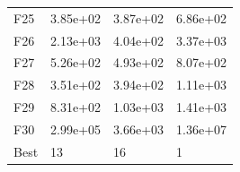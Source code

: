 \begin{table}[H]
\begin{minipage}{.5\linewidth}
\begin{tabular}{llll}
          F25  &  3.85e+02 &  3.87e+02 &  6.86e+02 \\
          F26  &  2.13e+03 &  4.04e+02 &  3.37e+03 \\
          F27  &  5.26e+02 &  4.93e+02 &  8.07e+02 \\
          F28  &  3.51e+02 &  3.94e+02 &  1.11e+03 \\
          F29  &  8.31e+02 &  1.03e+03 &  1.41e+03 \\
          F30  &  2.99e+05 &  3.66e+03 &  1.36e+07 \\
          Best &        13 &        16 &         1 \\
          \bottomrule
          \end{tabular}
          
    \end{minipage} 
\end{table}

